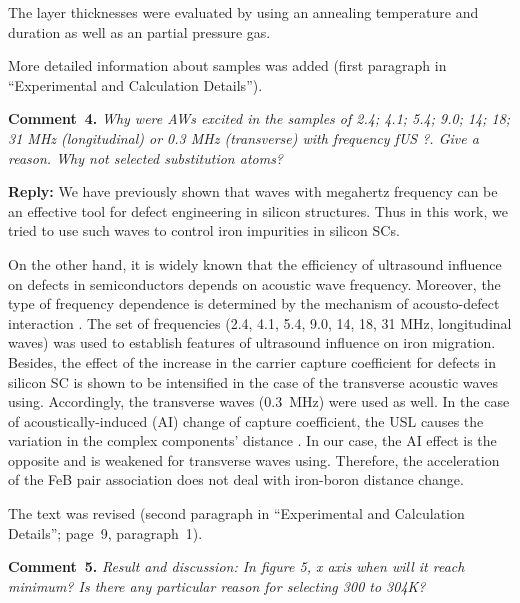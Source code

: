 \documentclass[sn-mathphys]{sn-jnl}
\begin{document}
The layer thicknesses were evaluated by using an annealing  temperature and duration as well as an partial pressure gas.

More detailed information about samples was added
(first paragraph in ``Experimental and Calculation Details'').


\vspace{1cm}
\noindent
\textcolor[rgb]{0.00,0.50,1.00}{\textbf{Comment~4.}}
\emph{Why were AWs excited in the samples of 2.4; 4.1; 5.4; 9.0; 14; 18; 31 MHz (longitudinal) or 0.3 MHz (transverse) with frequency fUS ?. Give a reason. Why not selected substitution atoms?}

\noindent
\textcolor[rgb]{0.51,0.00,0.00}{\textbf{Reply:}}
We have previously shown \cite{Olikh2018SM,Olikh2018JAP,OlikhJAP,GORB2020,Olikh:Ultras,Olikh:Ultras2016}
that waves with megahertz frequency can be an effective tool for defect engineering in silicon structures.
Thus in this work, we tried to use such waves to control iron impurities in silicon SCs.

On the other hand,
it is widely known that the efficiency of ultrasound influence on  defects in semiconductors depends on acoustic wave frequency.
Moreover, the type of frequency dependence is determined by the mechanism of acousto-defect
interaction \cite{Brailsford,Pavlovich,PeleshchakUJF2016}.
The set of frequencies (2.4, 4.1, 5.4, 9.0, 14, 18, 31 MHz, longitudinal waves)
was used to establish features of
ultrasound influence on iron migration.
Besides,  the effect of the increase in the carrier capture coefficient for defects in silicon SC
is shown \cite{Olikh2018SM} to be intensified in the case of the transverse acoustic waves using.
Accordingly, the transverse waves (0.3~MHz) were used as well.
In the case of acoustically-induced (AI) change of capture coefficient, the
USL causes the variation in the complex components' distance \cite{Olikh2018SM}.
 In our case, the AI effect is the opposite and is weakened for transverse waves using.
Therefore, the acceleration of the FeB pair association does not deal with iron-boron distance change.

The text was revised
(second paragraph in ``Experimental and Calculation Details'';
page~9, paragraph~1).


\vspace{1cm}
\noindent
\textcolor[rgb]{0.00,0.50,1.00}{\textbf{Comment~5.}}
\emph{Result and discussion: In figure 5, x axis when will it reach minimum? Is there any particular reason for selecting 300 to 304K?}
\end{document}
